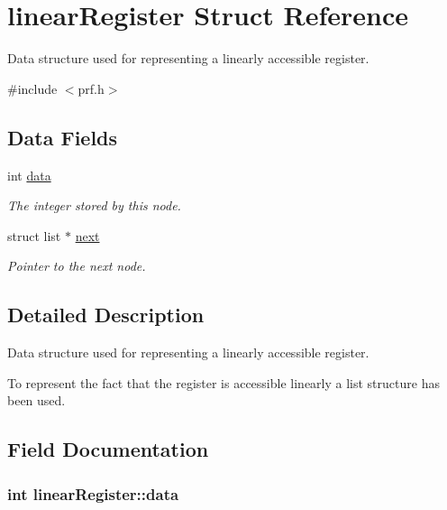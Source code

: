 \hypertarget{structlinear_register}{}\section{linear\+Register Struct Reference}
\label{structlinear_register}


Data structure used for representing a linearly accessible register.  




{\ttfamily \#include $<$prf.\+h$>$}

\subsection*{Data Fields}
\begin{DoxyCompactItemize}
\item 
int \hyperlink{structlinear_register_a32ae29b4ae3c2f14e2b21ad6cd4583ce}{data}
\begin{DoxyCompactList}\small\item\em The integer stored by this node. \end{DoxyCompactList}\item 
struct list $\ast$ \hyperlink{structlinear_register_a423cdb42b705e8994d7a064612062551}{next}
\begin{DoxyCompactList}\small\item\em Pointer to the next node. \end{DoxyCompactList}\end{DoxyCompactItemize}


\subsection{Detailed Description}
Data structure used for representing a linearly accessible register. 

To represent the fact that the register is accessible linearly a list structure has been used. 

\subsection{Field Documentation}
\hypertarget{structlinear_register_a32ae29b4ae3c2f14e2b21ad6cd4583ce}{}
\subsubsection[{data}]{\setlength{\rightskip}{0pt plus 5cm}int linear\+Register\+::data}\label{structlinear_register_a32ae29b4ae3c2f14e2b21ad6cd4583ce}


